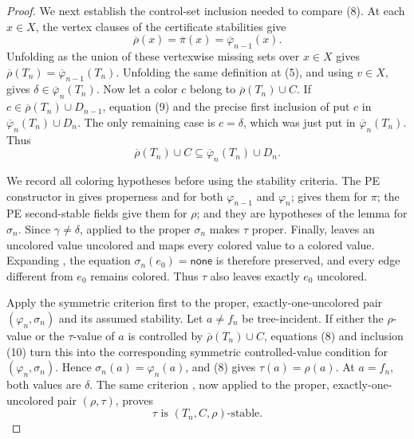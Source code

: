 \begin{proof}
We next establish the control-set inclusion needed to compare (8).  At
each \(x\in X\), the vertex clauses of the certificate stabilities give
\[
 \overline\rho(x)=\overline\pi(x)
                  =\overline\varphi_{n-1}(x).                  \tag{9}
\]
Unfolding  as the union of these vertexwise
missing sets over \(x\in X\) gives
\(\overline\rho(T_n)=\overline\varphi_{n-1}(T_n)\).  Unfolding the same
definition at (5), and using \(v\in X\), gives
\(\delta\in\overline\varphi_n(T_n)\).  Now let a color \(c\) belong to
\(\overline\rho(T_n)\cup C\).  If
\(c\in\overline\rho(T_n)\cup D_{n-1}\), equation (9) and the precise
first inclusion of  put \(c\) in
\(\overline\varphi_n(T_n)\cup D_n\).  The only remaining case is
\(c=\delta\), which was just put in
\(\overline\varphi_n(T_n)\).  Thus
\[
 \overline\rho(T_n)\cup C
 \subseteq \overline\varphi_n(T_n)\cup D_n.                    \tag{10}
\]

We record all coloring hypotheses before using the stability criteria.
The PE constructor in  gives properness and
 for both
\(\varphi_{n-1}\) and \(\varphi_n\);
 gives them for \(\pi\); the PE
second-stable fields give them for \(\rho\); and they are hypotheses of
the lemma for \(\sigma_n\).  Since \(\gamma\ne\delta\),
 applied to the proper
\(\sigma_n\) makes \(\tau\) proper.  Finally,
 leaves an uncolored value uncolored and
maps every colored value to a colored value.  Expanding
, the equation
\(\sigma_n(e_0)=\mathsf{none}\) is therefore preserved, and every
edge different from \(e_0\) remains colored.  Thus \(\tau\) also leaves
exactly \(e_0\) uncolored.

Apply the symmetric criterion  first to the proper,
exactly-one-uncolored pair \((\varphi_n,\sigma_n)\) and its assumed
stability.  Let \(a\ne f_n\) be tree-incident.  If either the
\(\rho\)-value or the \(\tau\)-value of \(a\) is controlled by
\(\overline\rho(T_n)\cup C\), equations (8) and inclusion (10) turn this
into the corresponding symmetric controlled-value condition for
\((\varphi_n,\sigma_n)\).  Hence
\(\sigma_n(a)=\varphi_n(a)\), and (8) gives
\(\tau(a)=\rho(a)\).  At \(a=f_n\), both values are \(\delta\).
The same criterion , now applied to the proper,
exactly-one-uncolored pair \((\rho,\tau)\), proves
\[
 \tau\text{ is }(T_n,C,\rho)\text{-stable}.                     \tag{11}
\]


\end{proof}
